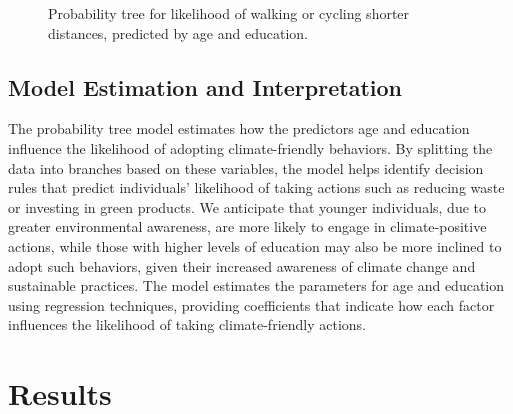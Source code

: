 \documentclass[
  letterpaper,
  DIV=11,
  numbers=noendperiod]{scrartcl}
\begin{document}
\begin{figure}


\caption{\label{fig-eighteen}Probability tree for likelihood of walking
or cycling shorter distances, predicted by age and education.}

\end{figure}%

\subsection{Model Estimation and
Interpretation}\label{model-estimation-and-interpretation}

The probability tree model estimates how the predictors age and
education influence the likelihood of adopting climate-friendly
behaviors. By splitting the data into branches based on these variables,
the model helps identify decision rules that predict individuals'
likelihood of taking actions such as reducing waste or investing in
green products. We anticipate that younger individuals, due to greater
environmental awareness, are more likely to engage in climate-positive
actions, while those with higher levels of education may also be more
inclined to adopt such behaviors, given their increased awareness of
climate change and sustainable practices. The model estimates the
parameters for age and education using regression techniques, providing
coefficients that indicate how each factor influences the likelihood of
taking climate-friendly actions.

\section{Results}\label{results}
\end{document}
